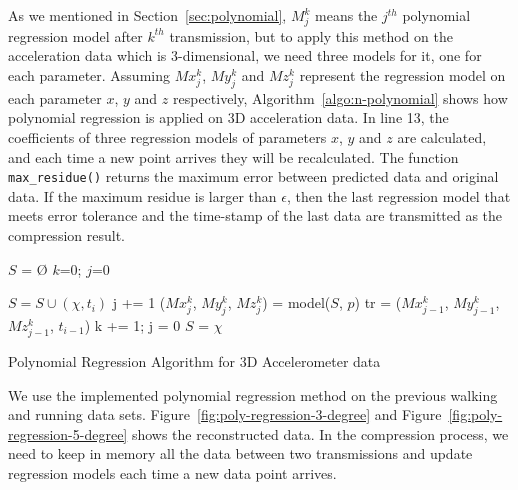 As we mentioned in Section~\ref{sec:polynomial}, $M_{j}^{k}$ means the $j^{th}$
polynomial regression model after $k^{th}$ transmission, but to apply this
method on the acceleration data which is 3-dimensional, we need three models for
it, one for each parameter. Assuming $Mx_{j}^{k}$, $My_{j}^{k}$ and $Mz_{j}^{k}$
represent the regression model on each parameter $x$, $y$ and $z$ respectively,
Algorithm~\ref{algo:n-polynomial} shows how polynomial regression is applied on
3D acceleration data. In line 13, the coefficients of three regression models of
parameters $x$, $y$ and $z$ are calculated, and each time a new point arrives
they will be recalculated. The function \texttt{max\_residue()} returns the
maximum error between predicted data and original data. If the maximum residue
is larger than $\epsilon$, then the last regression model that meets error
tolerance and the time-stamp of the last data are transmitted as the compression
result.
\begin{algorithm}
\begin{algorithmic}[1]
\Input
\EndInput
\Output
\EndOutput
\State $S$ = $\text{\O}$
\State $k$=0; $j$=0

    \State $S = S \cup (\chi, t_i)$
        \State j += 1
        \State ($Mx_{j}^{k}$, $My_{j}^{k}$, $Mz_{j}^{k}$) = model($S$, $p$)    
            \State tr = ($Mx_{j-1}^{k}$, $My_{j-1}^{k}$, $Mz_{j-1}^{k}$, $t_{i-1}$)
            \State k += 1; j = 0
            \State $S$ = $\chi$
        \EndIf
    \EndIf
\EndWhile

\end{algorithmic}
\caption{Polynomial Regression Algorithm for 3D Accelerometer data}
\label{algo:n-polynomial}
\end{algorithm}

We use the implemented polynomial regression method on the previous walking and
running data sets. Figure~\ref{fig:poly-regression-3-degree} and
Figure~\ref{fig:poly-regression-5-degree} shows the reconstructed data. In the
compression process, we need to keep in memory all the data between two
transmissions and update regression models each time a new data point arrives.

